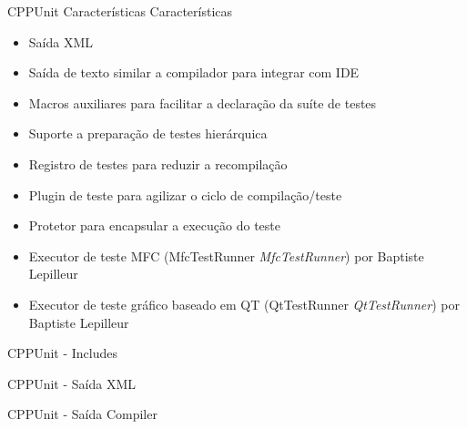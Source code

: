 \documentclass[10pt,a4paper]{beamer}
\begin{document}
	\begin{frame}{CPPUnit Características}
		Características \cite{MichaelFeathers:03}
		\begin{itemize}
			\item Saída XML
			\pause
			\item Saída de texto similar a compilador para integrar com IDE
			\pause
			\item Macros auxiliares para facilitar a declaração da suíte de testes
			\pause
			\item Suporte a preparação de testes hierárquica
			\pause
			\item Registro de testes para reduzir a recompilação
			\pause
			\item Plugin de teste para agilizar o ciclo de compilação/teste
			\pause
			\item Protetor para encapsular a execução do teste
			\pause
			\item Executor de teste MFC (MfcTestRunner \textit{MfcTestRunner}) por Baptiste Lepilleur \cite{BaptisteLepilleur:02}
			\pause
			\item Executor de teste gráfico baseado em QT (QtTestRunner \textit{QtTestRunner})	 por Baptiste Lepilleur \cite{BaptisteLepilleur:01}
		\end{itemize}
	\end{frame}

	\begin{frame}{CPPUnit - Includes}
		\begin{block}{}
				
		\end{block}
	\end{frame}	

	\begin{frame}{CPPUnit - Saída XML}
		\begin{tiny}
			\begin{block}{}
					
			\end{block}
		\end{tiny}
	\end{frame}	

	\begin{frame}{CPPUnit - Saída Compiler}
		\begin{tiny}
			\begin{block}{}
					
			\end{block}
		\end{tiny}
	\end{frame}	
\end{document}
